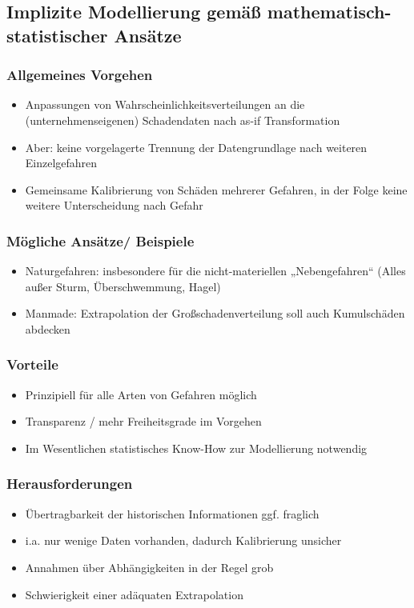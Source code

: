 \documentclass[12pt]{report}
\theoremstyle{dotless}
\theoremstyle{definition}
\begin{document}
\subsection{Implizite Modellierung gemäß mathematisch-statistischer Ansätze}

\subsubsection{Allgemeines Vorgehen}
\begin{itemize}
\item Anpassungen von Wahrscheinlichkeitsverteilungen an die (unternehmenseigenen)
Schadendaten nach as-if Transformation
\item Aber: keine vorgelagerte Trennung der Datengrundlage nach weiteren Einzelgefahren
\item Gemeinsame Kalibrierung von Schäden mehrerer Gefahren, in der Folge keine weitere Unterscheidung nach Gefahr
\end{itemize}

\subsubsection{Mögliche Ansätze/ Beispiele}
\begin{itemize}
\item Naturgefahren: insbesondere für die nicht-materiellen „Nebengefahren“ (Alles außer Sturm, Überschwemmung, Hagel)
\item Manmade: Extrapolation der Großschadenverteilung soll auch Kumulschäden
abdecken
\end{itemize}

\subsubsection{Vorteile}
\begin{itemize}
\item Prinzipiell für alle Arten von Gefahren möglich
\item Transparenz / mehr Freiheitsgrade im Vorgehen
\item Im Wesentlichen statistisches Know-How zur Modellierung notwendig
\end{itemize}

\subsubsection{Herausforderungen} \begin{itemize}
\item Übertragbarkeit der historischen Informationen ggf. fraglich
\item i.a. nur wenige Daten vorhanden, dadurch Kalibrierung unsicher
\item Annahmen über Abhängigkeiten in der Regel grob
\item Schwierigkeit einer adäquaten Extrapolation
\end{itemize}
\end{document}
